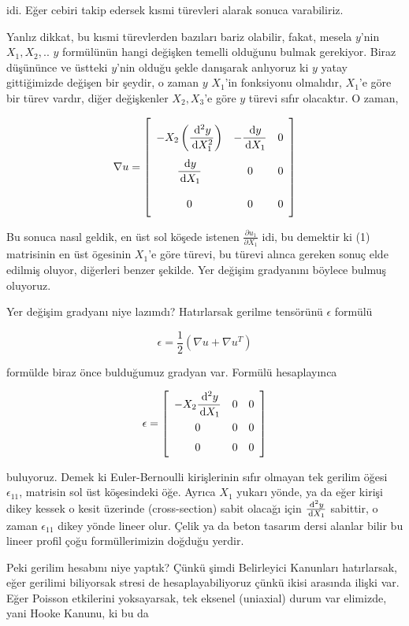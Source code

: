 \documentclass[12pt,fleqn]{article}\usepackage{../../common}
\begin{document}
idi. Eğer cebiri takip edersek kısmi türevleri alarak sonuca varabiliriz.

Yanlız dikkat, bu kısmi türevlerden bazıları bariz olabilir, fakat, mesela
$y$'nin $X_1,X_2,..$ $y$ formülünün hangi değişken temelli olduğunu bulmak
gerekiyor. Biraz düşününce ve üstteki $y$'nin olduğu şekle danışarak anlıyoruz
ki $y$ yatay gittiğimizde değişen bir şeydir, o zaman $y$ $X_1$'in fonksiyonu
olmalıdır, $X_1$'e göre bir türev vardır, diğer değişkenler $X_2,X_3$'e göre $y$
türevi sıfır olacaktır. O zaman,

$$
\renewcommand*{\arraystretch}{2.5}
\nabla u = \left[\begin{array}{ccc}
-X_2 \left( \dfrac{\ud^2 y}{\ud X_1^2} \right)  & - \dfrac{\ud y}{\ud X_1} & 0 \\ 
\dfrac{\ud y}{\ud X_1} & 0 & 0 \\ 
0 & 0 & 0
\end{array}\right]
$$

Bu sonuca nasıl geldik, en üst sol köşede istenen $\frac{\partial u_1}{\partial X_1}$
idi, bu demektir ki (1) matrisinin en üst ögesinin $X_1$'e göre türevi, bu
türevi alınca gereken sonuç elde edilmiş oluyor, diğerleri benzer şekilde.
Yer değişim gradyanını böylece bulmuş oluyoruz.

Yer değişim gradyanı niye lazımdı? Hatırlarsak gerilme tensörünü $\epsilon$
formülü

$$
\epsilon = \frac{1}{2} (\nabla u + \nabla u^T )
$$

formülde biraz önce bulduğumuz gradyan var. Formülü hesaplayınca 

$$
\renewcommand*{\arraystretch}{1.5}
\epsilon = \left[\begin{array}{ccc}
-X_2 \dfrac{\ud^2 y}{\ud X_1} & 0 & 0 \\
0 & 0 & 0 \\
0 & 0 & 0 
\end{array}\right]
$$

buluyoruz. Demek ki Euler-Bernoulli kirişlerinin sıfır olmayan tek gerilim öğesi
$\epsilon_{11}$, matrisin sol üst köşesindeki öğe. Ayrıca $X_1$ yukarı yönde, ya
da eğer kirişi dikey kessek o kesit üzerinde (cross-section) sabit olacağı için
$\frac{\,\mathrm{d}^2 y}{\,\mathrm{d} X_1}$ sabittir, o zaman $\epsilon_{11}$ dikey yönde lineer
olur. Çelik ya da beton tasarım dersi alanlar bilir bu lineer profil çoğu
formüllerimizin doğduğu yerdir.

Peki gerilim hesabını niye yaptık? Çünkü şimdi Belirleyici Kanunları
hatırlarsak, eğer gerilimi biliyorsak stresi de hesaplayabiliyoruz çünkü ikisi
arasında ilişki var. Eğer Poisson etkilerini yoksayarsak, tek eksenel (uniaxial)
durum var elimizde, yani Hooke Kanunu, ki bu da
\end{document}
